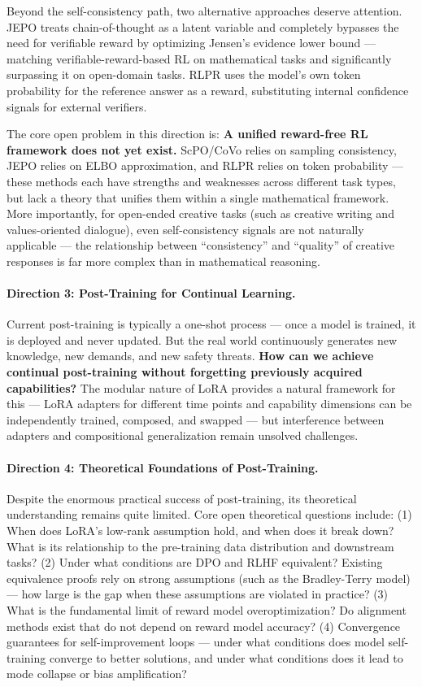 \noindent
Beyond the self-consistency path,
two alternative approaches deserve attention.
JEPO \cite{jepo2025} treats chain-of-thought as a latent variable
and completely bypasses the need for verifiable reward by optimizing Jensen's evidence lower bound ---
matching verifiable-reward-based RL on mathematical tasks and significantly surpassing it on open-domain tasks.
RLPR \cite{yu2025rlpr} uses the model's own token probability for the reference answer as a reward,
substituting internal confidence signals for external verifiers.

\noindent
The core open problem in this direction is:
\textbf{A unified reward-free RL framework does not yet exist.}
ScPO/CoVo relies on sampling consistency, JEPO relies on ELBO approximation, and RLPR relies on token probability ---
these methods each have strengths and weaknesses across different task types,
but lack a theory that unifies them within a single mathematical framework.
More importantly, for open-ended creative tasks (such as creative writing and values-oriented dialogue),
even self-consistency signals are not naturally applicable ---
the relationship between ``consistency'' and ``quality'' of creative responses is far more complex than in mathematical reasoning.

\paragraph{Direction 3: Post-Training for Continual Learning.}
Current post-training is typically a one-shot process ---
once a model is trained, it is deployed and never updated.
But the real world continuously generates new knowledge, new demands, and new safety threats.
\textbf{How can we achieve continual post-training
without forgetting previously acquired capabilities?}
The modular nature of LoRA provides a natural framework for this ---
LoRA adapters for different time points and capability dimensions can be independently trained, composed, and swapped ---
but interference between adapters and compositional generalization
remain unsolved challenges.

\paragraph{Direction 4: Theoretical Foundations of Post-Training.}
Despite the enormous practical success of post-training,
its theoretical understanding remains quite limited.
Core open theoretical questions include:
(1) When does LoRA's low-rank assumption hold, and when does it break down?
What is its relationship to the pre-training data distribution and downstream tasks?
(2) Under what conditions are DPO and RLHF equivalent?
Existing equivalence proofs rely on strong assumptions (such as the Bradley-Terry model) ---
how large is the gap when these assumptions are violated in practice?
(3) What is the fundamental limit of reward model overoptimization?
Do alignment methods exist that do not depend on reward model accuracy?
(4) Convergence guarantees for self-improvement loops ---
under what conditions does model self-training converge to better solutions,
and under what conditions does it lead to mode collapse or bias amplification?

